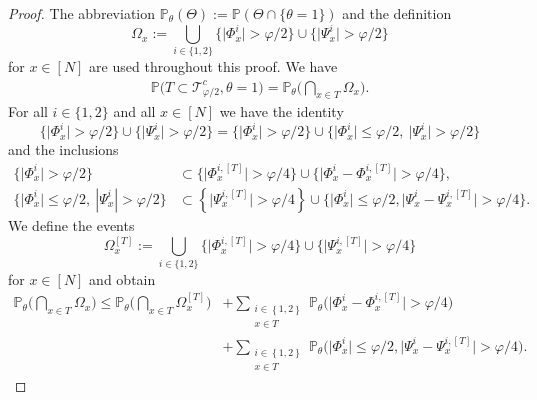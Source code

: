 \documentclass[10pt,a4paper]{amsart}
\newcommand{\abs}[1]{\left| #1 \right|}
\newcommand{\absn}[1]{\bigl| #1 \bigr|} %
\newcommand{\event}[1]{\big\{ #1 \big\}}
\numberwithin{equation}{section}
\newcommand*\bset[1]{[#1]}
\begin{document}
	\begin{proof}
		The abbreviation $\mathbb{P}_{\theta}(\Theta) := \mathbb{P}(\Theta \cap \{ \theta =1 \})$ and the definition 
		\begin{equation*}
			\Omega_x := \bigcup_{i \in \{1,2\}}\{ \absn{\Phi^{i}_x} > \varphi/2\} \cup \{ \absn{\Psi^{i}_x} > \varphi/2\}
		\end{equation*}
		for $x \in [N]$ are used throughout this proof. We have
		\begin{align*}
			\mathbb{P} \big( T \subset \mathcal{T}_{\varphi/2}^{c}, \theta =1\big) = \mathbb{P}_{\theta} \big( \bigcap_{x \in T}\Omega_x \big).
		\end{align*}
		For all $i \in \{1,2\}$ and all $x \in [N]$ we have the identity 
		\begin{equation*}
			\big\{ \bigl|\Phi^{i}_x\bigr| > \varphi/2\big\} \cup \big\{ \bigl|\Psi^{i}_x\bigr| > \varphi/2\big\} = \big\{ \bigl|\Phi^{i}_x\bigr|> \varphi/2\big\} \cup \big\{ \bigl|\Phi^{i}_x\bigr|\le \varphi/2,~\bigl|\Psi^{i}_x\big| > \varphi/2\big\}
		\end{equation*}
		and the inclusions 
		\begin{align*}
			\big\{ \bigl|\Phi^{i}_x\bigr| > \varphi/2\big\}  &\subset \{\absn{\Phi^{i,\bset{T}}_x} > \varphi/4\big\} \cup   \event{\absn{\Phi^{i}_x-\Phi^{i,\bset{T}}_x} > \varphi/4},\\
			\event{ \absn{\Phi^{i}_x} \le \varphi/2,~\abs{\Psi^{i}_x} > \varphi/2} & \subset \left\{\absn{\Psi^{i,\bset{T}}_x} > \varphi/4\right\}\cup\event{ \absn{\Phi^{i}_x} \le \varphi/2, \absn{\Psi^{i}_x - \Psi^{i, \bset{T}}_x} > \varphi/4}.
		\end{align*}
		We define the events
		\begin{equation*}
			\Omega_x^{\bset{T}} := \bigcup_{i \in \{1,2\}} \bigl\{ \absn{\Phi^{i,\bset{T}}_x} > \varphi/4\bigr\} \cup \bigl\{ \absn{\Psi^{i,\bset{T}}_x} > \varphi/4\bigr\}
		\end{equation*}
		for $x \in [N]$ and obtain 
		\begin{equation} \label{eq:pbintersectionOmegax}
			\begin{aligned}
				\mathbb{P}_{\theta} \big( \bigcap_{x\in T} \Omega_x \big) \le \mathbb{P}_{\theta} \big( \bigcap_{x\in T} \Omega^{\bset{T}}_x \big) 
				& + \sum_{\substack{ i \in \left\{1,2\right\} \\ x\in T}} \mathbb{P}_{\theta} \big( \absn{\Phi^{i}_x-\Phi^{i,\bset{T}}_x} > \varphi/4\big)\\
				&+ \sum_{\substack{ i \in \left\{1,2\right\} \\ x\in T}} \mathbb{P}_{\theta} \big( \absn{\Phi^{i}_x} \le \varphi/2, \absn{\Psi^{i}_x - \Psi^{i, \bset{T}}_x} > \varphi/4\big). 

\end{aligned}
\end{equation}
\end{proof}
\end{document}
